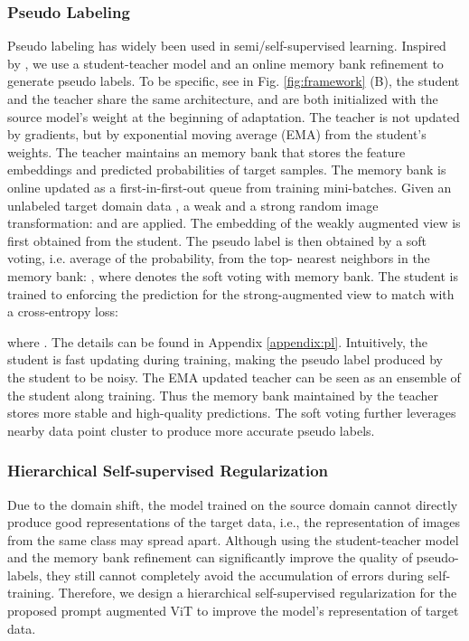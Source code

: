 \documentclass{article} \usepackage{iclr2023_conference,times}
\begin{document}
\subsubsection{Pseudo Labeling}

Pseudo labeling has widely been used in semi/self-supervised learning. Inspired by \citet{tarvainen2017mean,sohn2020fixmatch,chen2022contrastive}, we use a student-teacher model and an online memory bank refinement to generate pseudo labels. To be specific, see in Fig. \ref{fig:framework} (B), the student  and the teacher  share the same architecture, and are both initialized with the source model's weight  at the beginning of adaptation. The teacher is not updated by gradients, but by exponential moving average (EMA) from the student's weights. The teacher maintains an memory bank that stores the feature embeddings and predicted probabilities of target samples. The memory bank is online updated as a first-in-first-out queue from training mini-batches. Given an unlabeled target domain data , a weak and a strong random image transformation:  and  are applied. The embedding of the weakly augmented view is first obtained from the student.  The pseudo label is then obtained by a soft voting, i.e. average of the probability, from the top- nearest neighbors in the memory bank: , where  denotes the soft voting with memory bank. The student is trained to enforcing the prediction for the strong-augmented view to match  with a cross-entropy loss:

where . The details can be found in Appendix \ref{appendix:pl}. Intuitively, the student is fast updating during training, making the pseudo label produced by the student to be noisy. The EMA updated teacher can be seen as an ensemble of the student along training. Thus the memory bank maintained by the teacher stores more stable and high-quality predictions. The soft voting further leverages nearby data point cluster to produce more accurate pseudo labels.


\subsubsection{Hierarchical Self-supervised  Regularization}

Due to the domain shift, the model trained on the source domain cannot directly produce good representations of the target data, i.e., the representation of images from the same class may spread apart. Although using the student-teacher model and the memory bank refinement can significantly improve the quality of pseudo-labels, they still cannot completely avoid the accumulation of errors during self-training. Therefore, we design a hierarchical self-supervised regularization for the proposed prompt augmented ViT to improve the model's representation of target data.
\end{document}
